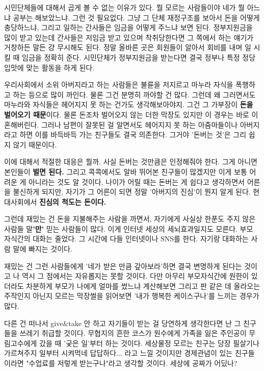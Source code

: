 시민단체들에 대해서 곱게 볼 수 없는 이유가 있다. 뭘 모르는 사람들이야 네가 뭘 아느냐 공부는 해보았느냐.
그런 것 필요없다. 그냥 그 단체 재정구조를 보아서 돈을 어떻게 충당하느냐, 그리고 일하는 간사들은 임금을 어떻게 주느냐 보면 된다.
정부지원금을 많이 받고 있는데 간사들은 저임금 받고 있으며 착취당한다면 그 쪽에서 하는 얘기가 거창하든 말든 걍 무시해도 된다.
정말 올바른 곳은 회원들이 알아서 회비를 내며 일 시킬 때 임금을 정확히 준다.
시민단체가 정부지원금을 받는다면 결국 정부나 특정 정당 입맛에 맞는 활동을 하게 된다.
\vspace{5mm}

우리사회에서 소위 아버지라고 하는 사람들은 불륜을 저지르고 마누라 자식을 폭행하고 하는 등으로 많이 까인다.
물론 그건 분명히 까야할 건 많다. 그런데 왜 그러면서도 마누라와 자식들은 헤어지지 못 하는 건가도 생각해보아야지.
그건 그 가부장이 \textbf{돈을 벌어오기 때문}이다.
물론 돈조차 벌어오지 않는 더한 막장도 있지만 이 경우는 바로 이혼해버린다.
그러나 남편이 잘못된 걸 알면서도 헤어지지 못 하는 아줌마들이나 아버지라고 하면 이를 바득바득 가는 친구들도 결국 의존한다.
그거야 '돈버는 것'은 그리 쉽지 않기 때문이다.
\vspace{5mm}

이에 대해서 적절한 대응은 뭘까. 사실 돈버는 것만큼은 인정해줘야 한다. 그게 아니면 본인들이 \textbf{벌면 된다.}
그리고 콕콕에서도 알바 뛰어본 친구들이 많겠지만 이게 보통 어려운 게 아니라는 것도 알 것이다.
나이가 어릴 때는 돈버는 게 쉽다고 생각하면서 어른을 불신하게 되지만, 자기가 그 어른이 되면 정말 '아버지의 진심'이 뭔지 알게 된다.
현대사회에서 \textbf{진심의 척도는 돈이다.}
\vspace{5mm}

그런데 재밌는 건 돈을 지불해주는 사람을 까면서, 자기에게 사실상 한푼도 주지 않은 사람들 말\textbf{'만'} 믿는 사람들이 많다.
이게 인터넷 세상의 세뇌효과일지도 모른다.
부모 자식간의 대화는 줄었다. 그 시간에 다들 인터넷이나 SNS를 한다.
자기랑 대화하는 사람 말에 빠지는 것이다.
\vspace{5mm}

재밌는 건 그런 사람들에게 '네가 받은 만큼 갚아보라'하면 결국 변명하게 된다는 것이고
나 역시 그 점에서는 자유롭지는 못할 것이다.
다만 아무리 부모자식간에 원한이 있더라도 차분하게 부모가 나에게 얼마를 썼느냐 계산해보면
그리고 판 같은 데 올라오는 주작인지 아닌지 모르는 막장썰을 읽어보면 '내가 행복한 케이스구나'를 느끼는 경우가 많다.
\vspace{5mm}

다른 건 떠나서 give$\&$take 안 하고 자기들이 받는 걸 당연하게 생각한다면 난 그 친구들을 쓰레기 취급할 것이다.
무협지의 흔한 코스가 원수에게 가족을 잃은 주인공이 무림고수에게 갔을 때 '궂은 일'부터 하는 것이다.
세상물정 모르는 친구는 당장 필살기나 가르쳐주지 일부터 시켜먹네 답답하다... 라고 느낄 것이지만
경제관념이 있는 친구들이라면 "수업료를 저렇게 받는구나"라고 생각할 것이다. 세상에 공짜가 어딨나?
\vspace{5mm}

